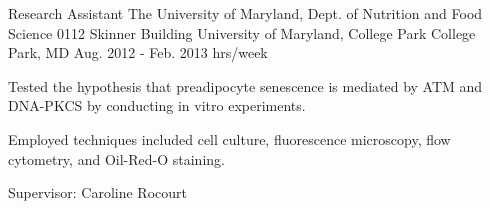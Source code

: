 \begin{cventries}

  \cventry
    {Research Assistant} %
    {The University of Maryland, Dept. of Nutrition and Food Science} %
    {0112 Skinner Building \newline
University of Maryland, College Park \newline
College Park, MD} %
    {Aug. 2012 - Feb. 2013  hrs/week} %
    {
      \begin{cvitems} %
        \item {Tested the hypothesis that preadipocyte senescence is mediated by ATM and DNA-PKCS by conducting in vitro experiments.}
        \item{Employed techniques included cell culture, fluorescence microscopy, flow cytometry, and Oil-Red-O staining.}
         \item{Supervisor: Caroline Rocourt}
      \end{cvitems}
    }

\end{cventries}
